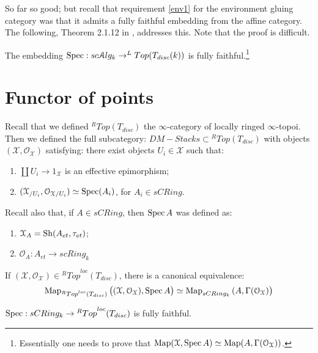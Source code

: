 So far so good; but recall that requirement \ref{env1} for the environment gluing category was that it admits a fully
faithful embedding from the affine category. The following, Theorem 2.1.12 in \cite{DAG-V}, addresses this. Note that
the proof is difficult.

\begin{thm}
The embedding $\operatorname{Spec} : sc\mathcal A lg_k \to ^L Top(T_{disc}(k))$ is fully faithful.\footnote{Essentially one needs to prove that
$\operatorname{Map}(\mathcal{X}, \operatorname{Spec} A) \simeq \operatorname{Map}(A, \Gamma(\mathcal{O}_{\mathcal{X}}))$.}
\end{thm}



\section{Functor of points}
Recall that we defined $^R Top(T_{disc})$ the $\infty$-category of locally ringed $\infty$-topoi. Then we defined the
full subcategory: $DM-Stacks \subset {^R Top}(T_{disc})$ with objects $(\mathcal{X},\mathcal{O}_{\mathcal{X}})$ satisfying:
there exist objects $U_i \in \mathcal{X}$ such that:
\begin{enumerate}
\item $\coprod U_i \to 1_{\mathcal{X}}$ is an effective epimorphism;
\item $(\mathcal{X}_{/U_i}, \mathcal{O}_{\mathcal{X}/U_i}) \simeq \operatorname{Spec} (A_i)$, for $A_i \in sCRing$.
\end{enumerate}

Recall also that, if $A \in sCRing$, then $\operatorname{Spec} A$ was defined as:
\begin{enumerate}
\item $\mathcal{X}_A = \mathrm{Sh} (A_{et}, \tau_{et})$;
\item $\mathcal{O}_A : A_{et} \to scRing_k$
\end{enumerate}

\begin{thm}
If $(\mathcal{X},\mathcal{O}_{\mathcal{X}}) \in {^R Top}^{loc}(T_{disc})$, there is a canonical equivalence:
\[	\operatorname{Map}_{{^R Top}^{loc}(T_{disc})}\big( (\mathcal{X},\mathcal{O}_{\mathcal{X}}), \operatorname{Spec} A\big)
\simeq \operatorname{Map}_{sCRing_k}\big.(A,\Gamma(\mathcal{O}_{\mathcal{X}})\big)	\]
\end{thm}

\begin{cor}
$\operatorname{Spec} : sCRing_k \to {^R Top}^{loc}(T_{disc})$ is fully faithful.
\end{cor}

